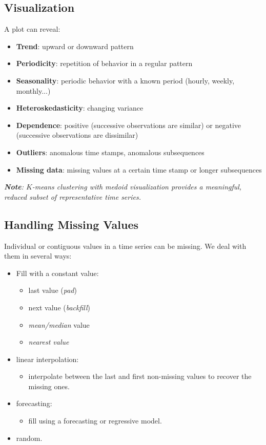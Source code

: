 \subsection{Visualization}
A plot can reveal:
\begin{itemize}
    \item \textbf{Trend}: upward or downward pattern
    \item \textbf{Periodicity}: repetition of behavior in a regular pattern
    \item \textbf{Seasonality}: periodic behavior with a known period (hourly, weekly, monthly...)
    \item \textbf{Heteroskedasticity}: changing variance
    \item \textbf{Dependence}: positive (successive observations are similar) or negative (successive observations are dissimilar)
    \item \textbf{Outliers}: anomalous time stamps, anomalous subsequences
    \item \textbf{Missing data}: missing values at a certain time stamp or longer subsequences
\end{itemize}

\textit{\textbf{Note}: $K$-means clustering with medoid visualization provides a meaningful, reduced subset of representative time series.}
\subsection{Handling Missing Values}
Individual or contiguous values in a time series can be missing. We deal with them in several ways:
\begin{itemize}
    \item Fill with a constant value:
    \begin{itemize}
        \item last value (\textit{pad})
        \item next value (\textit{backfill})
        \item \textit{mean/median} value
        \item \textit{nearest value}
    \end{itemize}
    \item linear interpolation:
    \begin{itemize}
        \item interpolate between the last and first non-missing values to recover the missing ones.
    \end{itemize}
    \item forecasting:
    \begin{itemize}
        \item fill using a forecasting or regressive model.
    \end{itemize}
    \item random.
\end{itemize}

